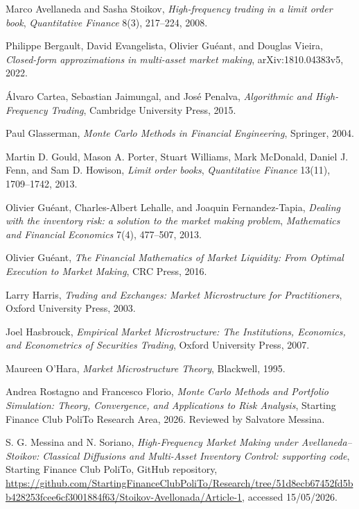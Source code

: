 \begin{references}
 Marco Avellaneda and Sasha Stoikov,
\emph{High-frequency trading in a limit order book},
\emph{Quantitative Finance} 8(3), 217--224, 2008.

 Philippe Bergault, David Evangelista, Olivier Gu\'eant, and Douglas Vieira,
\emph{Closed-form approximations in multi-asset market making},
arXiv:1810.04383v5, 2022.

 \'Alvaro Cartea, Sebastian Jaimungal, and Jos\'e Penalva,
\emph{Algorithmic and High-Frequency Trading},
Cambridge University Press, 2015.

 Paul Glasserman,
\emph{Monte Carlo Methods in Financial Engineering},
Springer, 2004.

 Martin D. Gould, Mason A. Porter, Stuart Williams, Mark McDonald, Daniel J. Fenn, and Sam D. Howison,
\emph{Limit order books},
\emph{Quantitative Finance} 13(11), 1709--1742, 2013.

 Olivier Gu\'eant, Charles-Albert Lehalle, and Joaquin Fernandez-Tapia,
\emph{Dealing with the inventory risk: a solution to the market making problem},
\emph{Mathematics and Financial Economics} 7(4), 477--507, 2013.

 Olivier Gu\'eant,
\emph{The Financial Mathematics of Market Liquidity: From Optimal Execution to Market Making},
CRC Press, 2016.

 Larry Harris,
\emph{Trading and Exchanges: Market Microstructure for Practitioners},
Oxford University Press, 2003.

 Joel Hasbrouck,
\emph{Empirical Market Microstructure: The Institutions, Economics, and Econometrics of Securities Trading},
Oxford University Press, 2007.

 Maureen O'Hara,
\emph{Market Microstructure Theory},
Blackwell, 1995.

 Andrea Rostagno and Francesco Florio,
\emph{Monte Carlo Methods and Portfolio Simulation: Theory, Convergence, and Applications to Risk Analysis},
Starting Finance Club PoliTo Research Area, 2026.
Reviewed by Salvatore Messina.

 S. G. Messina and N. Soriano,
\emph{High-Frequency Market Making under Avellaneda--Stoikov: Classical Diffusions and Multi-Asset Inventory Control: supporting code},
Starting Finance Club PoliTo, GitHub repository,
\url{https://github.com/StartingFinanceClubPoliTo/Research/tree/51d8ecb67452fd5bb428253fcee6cf3001884f63/Stoikov-Avellonada/Article-1},
accessed 15/05/2026.


\end{references}
